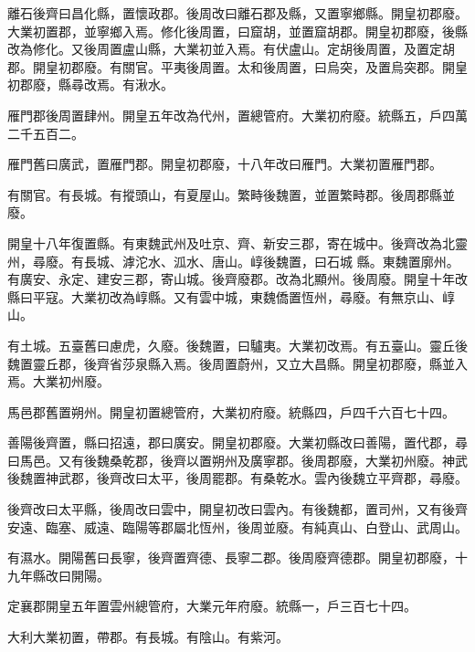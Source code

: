 \begin{pinyinscope}
 離石後齊曰昌化縣，置懷政郡。後周改曰離石郡及縣，又置寧鄉縣。開皇初郡廢。大業初置郡，並寧鄉入焉。修化後周置，曰窟胡，並置窟胡郡。開皇初郡廢，後縣改為修化。又後周置盧山縣，大業初並入焉。有伏盧山。定胡後周置，及置定胡郡。開皇初郡廢。有關官。平夷後周置。太和後周置，曰烏突，及置烏突郡。開皇初郡廢，縣尋改焉。有湫水。



 雁門郡後周置肆州。開皇五年改為代州，置總管府。大業初府廢。統縣五，戶四萬二千五百二。



 雁門舊曰廣武，置雁門郡。開皇初郡廢，十八年改曰雁門。大業初置雁門郡。



 有關官。有長城。有摐頭山，有夏屋山。繁畤後魏置，並置繁畤郡。後周郡縣並廢。



 開皇十八年復置縣。有東魏武州及吐京、齊、新安三郡，寄在城中。後齊改為北靈州，尋廢。有長城、滹沱水、泒水、唐山。崞後魏置，曰石城
 縣。東魏置廓州。有廣安、永定、建安三郡，寄山城。後齊廢郡。改為北顯州。後周廢。開皇十年改縣曰平寇。大業初改為崞縣。又有雲中城，東魏僑置恆州，尋廢。有無京山、崞山。



 有土城。五臺舊曰慮虎，久廢。後魏置，曰驢夷。大業初改焉。有五臺山。靈丘後魏置靈丘郡，後齊省莎泉縣入焉。後周置蔚州，又立大昌縣。開皇初郡廢，縣並入焉。大業初州廢。



 馬邑郡舊置朔州。開皇初置總管府，大業初府廢。統縣四，戶四千六百七十四。



 善陽後齊置，縣曰招遠，郡曰廣安。開皇初郡廢。大業初縣改曰善陽，置代郡，尋曰馬邑。又有後魏桑乾郡，後齊以置朔州及廣寧郡。後周郡廢，大業初州廢。神武後魏置神武郡，後齊改曰太平，後周罷郡。有桑乾水。雲內後魏立平齊郡，尋廢。



 後齊改曰太平縣，後周改曰雲中，開皇初改曰雲內。有後魏都，置司州，又有後齊安遠、臨塞、威遠、臨陽等郡屬北恆州，後周並廢。有純真山、白登山、武周山。



 有濕水。開陽舊曰長寧，後齊置齊德、長寧二郡。後周廢齊德郡。開皇初郡廢，十九年縣改曰開陽。



 定襄郡開皇五年置雲州總管府，大業元年府廢。統縣一，戶三百七十四。



 大利大業初置，帶郡。有長城。有陰山。有紫河。




\end{pinyinscope}
